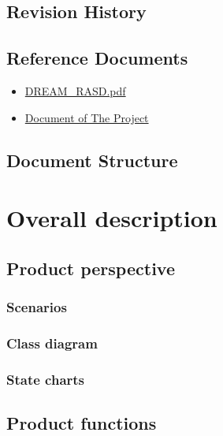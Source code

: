 \documentclass{article}
\begin{document}
 
\subsection{Revision History}

\subsection{Reference Documents}

\begin{itemize}
    \large
    \item \href{https://webeep.polimi.it/pluginfile.php/515844/mod_folder/content/0/ProjectToBeReviewed/RASD.pdf}{DREAM\_RASD.pdf}\\
    \item \href{https://webeep.polimi.it/pluginfile.php/515844/mod_folder/content/0/Assignment%20RDD%20AY%202022-2023_v3.pdf?forcedownload=1}{Document of The Project}
\end{itemize}

\subsection{Document Structure}

\section{Overall description}

\subsection{Product perspective}

\subsubsection{Scenarios}

\subsubsection{Class diagram}

\subsubsection{State charts}

\subsection{Product functions}
\end{document}

